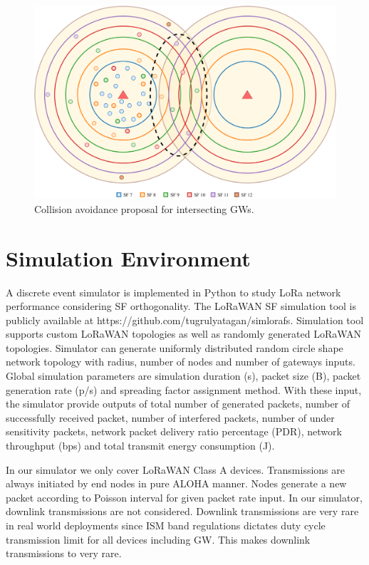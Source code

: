 \documentclass[conference]{IEEEtran}
\begin{document}
\begin{figure}
\centering
\includegraphics[width=\linewidth]{collision_solution_multi_gw}
\caption{Collision avoidance proposal for intersecting GWs.}
\label{fig:collision_solution_multi_gw}
\end{figure}


\section{Simulation Environment} \label{Simulation Environment}
\par A discrete event simulator is implemented in Python to study LoRa network performance considering SF orthogonality. The LoRaWAN SF simulation tool is publicly available at https://github.com/tugrulyatagan/simlorafs. Simulation tool supports custom LoRaWAN topologies as well as randomly generated LoRaWAN topologies. Simulator can generate uniformly distributed random circle shape network topology with radius, number of nodes and number of gateways inputs. Global simulation parameters are simulation duration (s), packet size (B), packet generation rate (p/s) and spreading factor assignment method. With these input, the simulator provide outputs of total number of generated packets, number of successfully received packet, number of interfered packets, number of under sensitivity packets, network packet delivery ratio percentage (PDR), network throughput (bps) and total transmit energy consumption (J).

\par In our simulator we only cover LoRaWAN Class A devices. Transmissions are always initiated by end nodes in pure ALOHA manner. Nodes generate a new packet according to Poisson interval for given packet rate input. In our simulator, downlink transmissions are not considered. Downlink transmissions are very rare in real world deployments since ISM band regulations dictates duty cycle transmission limit for all devices including GW. This makes downlink transmissions to very rare.
\end{document}
